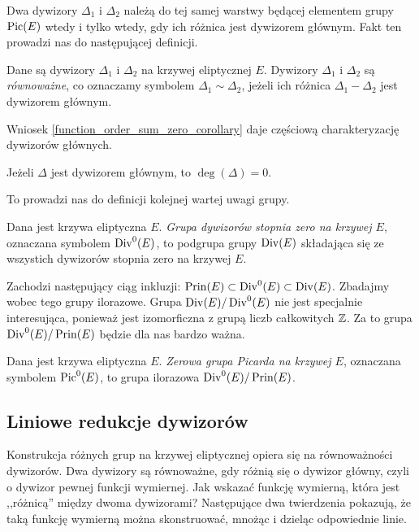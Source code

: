\noindent
Dwa dywizory $\Delta_1$ i $\Delta_2$ należą do tej samej warstwy
będącej elementem grupy $\operatorname{Pic}(E)$
wtedy i tylko wtedy, gdy ich różnica jest dywizorem głównym.
Fakt ten prowadzi nas do następującej definicji.

\begin{definition}
Dane są dywizory $\Delta_1$ i $\Delta_2$ na krzywej eliptycznej $E$.
Dywizory $\Delta_1$ i $\Delta_2$ są \emph{równoważne},
co oznaczamy symbolem $\Delta_1 \sim \Delta_2$,
jeżeli ich różnica $\Delta_1 - \Delta_2$ jest dywizorem głównym.
\end{definition}

\noindent
Wniosek \ref{function_order_sum_zero_corollary}
daje częściową charakteryzację dywizorów głównych.

\begin{fact}\label{prin_divi_zero_deg_fact}
Jeżeli $\Delta$ jest dywizorem głównym,
to $\deg(\Delta) = 0$.
\end{fact}

\noindent
To prowadzi nas do definicji kolejnej wartej uwagi grupy.

\begin{definition}
Dana jest krzywa eliptyczna $E$.
\emph{Grupa dywizorów stopnia zero na krzywej $E$},
oznaczana symbolem $\operatorname{Div}^0(E)$,
to podgrupa grupy $\operatorname{Div}(E)$
składająca się ze wszystich dywizorów stopnia zero na krzywej $E$.
\end{definition}

\noindent
Zachodzi następujący ciąg inkluzji:
$\operatorname{Prin}(E) \subset \operatorname{Div}^0(E) \subset \operatorname{Div}(E)$.
Zbadajmy wobec tego grupy ilorazowe.
Grupa $\operatorname{Div}(E) / \operatorname{Div}^0(E)$
nie jest specjalnie interesująca,
ponieważ jest izomorficzna z grupą liczb całkowitych $\mathbb{Z}$.
Za to grupa $\operatorname{Div}^0(E) / \operatorname{Prin}(E)$
będzie dla nas bardzo ważna.

\begin{definition}
Dana jest krzywa eliptyczna $E$.
\emph{Zerowa grupa Picarda na krzywej $E$},
oznaczana symbolem $\operatorname{Pic}^0(E)$,
to grupa ilorazowa $\operatorname{Div}^0(E) / \operatorname{Prin}(E)$.
\end{definition}

\subsection*{Liniowe redukcje dywizorów}

\noindent
Konstrukcja różnych grup na krzywej eliptycznej opiera się
na równoważności dywizorów. Dwa dywizory są równoważne,
gdy różnią się o dywizor główny, czyli o dywizor pewnej funkcji wymiernej.
Jak wskazać funkcję wymierną, która jest ,,różnicą'' między dwoma dywizorami?
Następujące dwa twierdzenia pokazują, że taką funkcję wymierną
można skonstruować, mnożąc i dzieląc odpowiednie linie.

